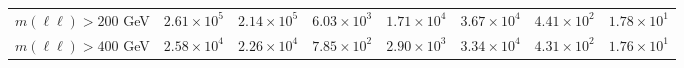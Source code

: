 \begin{table}[htp]
{\begin{tabular}{l | c c c c | c c c}
      $m(\ell\ell) > 200$ GeV & $2.61 \times 10^{5}$ & $2.14 \times 10^{5}$ & $6.03 \times 10^{3}$ & $1.71 \times 10^{4}$ & $3.67 \times 10^{4}$ & $4.41 \times 10^{2}$ & $1.78 \times 10^{1}$ \\
      $m(\ell\ell) > 400$ GeV & $2.58 \times 10^{4}$ & $2.26 \times 10^{4}$ & $7.85 \times 10^{2}$ & $2.90 \times 10^{3}$ & $3.34 \times 10^{4}$ & $4.31 \times 10^{2}$ & $1.76 \times 10^{1}$ \\
      \hline
    \end{tabular}
  }
\end{table}
